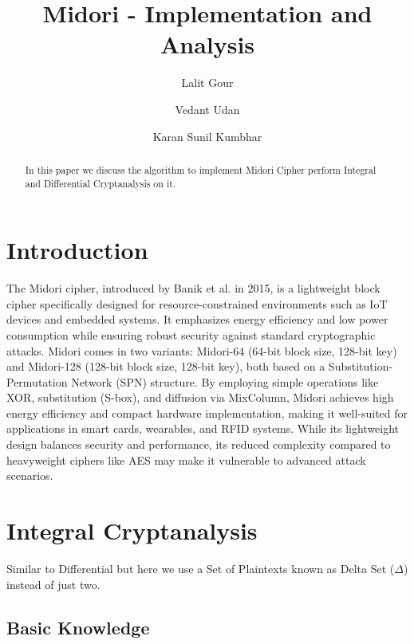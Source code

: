 \documentclass[journal=tosc,preprint]{iacrtrans}
\author{Lalit Gour\inst{1,2} \and Vedant Udan\inst{1,3} \and Karan Sunil Kumbhar\inst{1,4}}
\institute{
  \iitbhilai \and \email{lalitg@iitbhilai.ac.in} \and
  \email{udanvedant@iitbhilai.ac.in} \and
  \email{karansunilk@iitbhilai.ac.in} 
}
\title{Midori - Implementation and Analysis}
\begin{document}
\maketitle




\begin{abstract}

    In this paper we discuss the algorithm to implement Midori Cipher perform
    Integral and Differential Cryptanalysis on it.

\end{abstract}


\section{Introduction}

The Midori cipher, introduced by Banik et al. in 2015, is a lightweight block
cipher specifically designed for resource-constrained environments such as IoT
devices and embedded systems. It emphasizes energy efficiency and low power
consumption while ensuring robust security against standard cryptographic
attacks. Midori comes in two variants: Midori-64 (64-bit block size, 128-bit
key) and Midori-128 (128-bit block size, 128-bit key), both based on a
Substitution-Permutation Network (SPN) structure. By employing simple operations
like XOR, substitution (S-box), and diffusion via MixColumn, Midori achieves
high energy efficiency and compact hardware implementation, making it
well-suited for applications in smart cards, wearables, and RFID systems. While
its lightweight design balances security and performance, its reduced complexity
compared to heavyweight ciphers like AES may make it vulnerable to advanced
attack scenarios.

\section{Integral Cryptanalysis}
Similar to Differential but here we use a Set of Plaintexts known as Delta Set (\(\Delta\)) instead of just two.
\subsection{Basic Knowledge }
\end{document}
